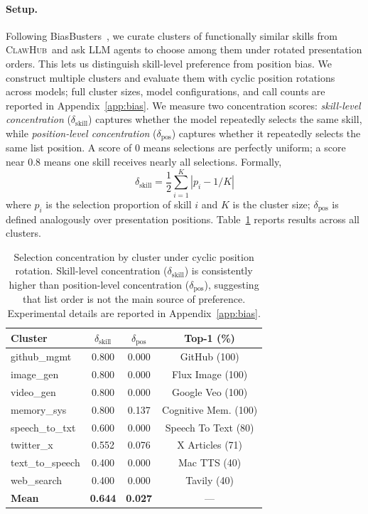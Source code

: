 \documentclass[11pt]{article}
\newcommand{\clawhub}{\textsc{ClawHub}\xspace}
\begin{document}
\paragraph{Setup.}
Following BiasBusters~\cite{biasbusters2026}, we curate
clusters of functionally similar skills from \clawhub\
and ask LLM agents to choose among them under rotated
presentation orders.
This lets us distinguish skill-level preference from
position bias.
We construct multiple clusters and evaluate them with
cyclic position rotations across models; full cluster
sizes, model configurations, and call counts are reported
in Appendix~\ref{app:bias}.
We measure two concentration scores: \emph{skill-level
concentration} ($\delta_\text{skill}$) captures whether the
model repeatedly selects the same skill, while
\emph{position-level concentration} ($\delta_\text{pos}$)
captures whether it repeatedly selects the same list
position.
A score of 0 means selections are perfectly uniform;
a score near 0.8 means one skill receives nearly all
selections.
Formally,
\[
\delta_\text{skill} = \frac{1}{2} \sum_{i=1}^{K} |p_i - 1/K|
\]
where $p_i$ is the selection proportion of skill $i$ and $K$
is the cluster size; $\delta_\text{pos}$ is defined analogously
over presentation positions.
Table~\ref{tab:bias} reports results across all clusters.

\begin{table}[t]
\centering\small
\begin{tabular}{lccc}
\toprule
\textbf{Cluster} & $\delta_\text{skill}$ & $\delta_\text{pos}$ & \textbf{Top-1 (\%)} \\
\midrule
github\_mgmt   & 0.800 & 0.000 & GitHub (100) \\
image\_gen     & 0.800 & 0.000 & Flux Image (100) \\
video\_gen     & 0.800 & 0.000 & Google Veo (100) \\
memory\_sys   & 0.800 & 0.137 & Cognitive Mem. (100) \\
speech\_to\_txt & 0.600 & 0.000 & Speech To Text (80) \\
twitter\_x    & 0.552 & 0.076 & X Articles (71) \\
text\_to\_speech & 0.400 & 0.000 & Mac TTS (40) \\
web\_search   & 0.400 & 0.000 & Tavily (40) \\
\midrule
\textbf{Mean} & \textbf{0.644} & \textbf{0.027} & --- \\
\bottomrule
\end{tabular}
\caption{Selection concentration by cluster under cyclic
position rotation.
Skill-level concentration ($\delta_\text{skill}$) is
consistently higher than position-level concentration
($\delta_\text{pos}$), suggesting that list order is
not the main source of preference.
Experimental details are reported in Appendix~\ref{app:bias}.}
\label{tab:bias}
\end{table}
\end{document}
